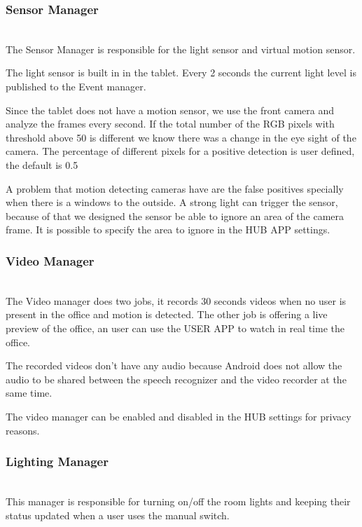 \subsubsection{Sensor Manager}\label{sensor_manager_imp}\mbox{}\\

The Sensor Manager is responsible for the light sensor and virtual motion sensor.

The light sensor is built in in the tablet. Every 2 seconds the current light level is published to the Event manager. 

Since the tablet does not have a motion sensor, we use the front camera and analyze the frames every second. If the total number of the RGB pixels with threshold above 50 is different we know there was a change in the eye sight of the camera. The percentage of different pixels for a positive detection is user defined, the default is 0.5%

A problem that motion detecting cameras have are the false positives specially when there is a windows to the outside. A strong light can trigger the sensor, because of that we designed the sensor be able to ignore an area of the camera frame. It is possible to specify the area to ignore in the HUB APP settings.


\subsubsection{Video Manager}\mbox{}\\

The Video manager does two jobs, it records 30 seconds videos when no user is present in the office and motion is detected. The other job is offering a live preview of the office, an user can use the USER APP to watch in real time the office.

The recorded videos don't have any audio because Android does not allow the audio to be shared between the speech recognizer and the video recorder at the same time.

The video manager can be enabled and disabled in the HUB settings for privacy reasons.



\subsubsection{Lighting Manager}\mbox{}\\

This manager is responsible for turning on/off the room lights and keeping their status updated when a user uses the manual switch.


